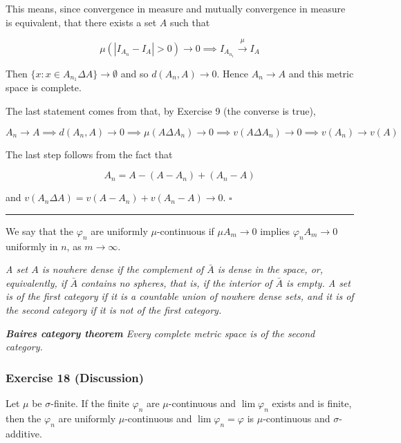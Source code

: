\documentclass[
]{article}
\begin{document}
This means, since convergence in measure and mutually convergence in
measure is equivalent, that there exists a set \(A\) such that

\[\mu\left(\left|I_{A_{n}} - I_{A}\right| > 0 \right) \to 0 \implies I_{A_{n_1}} \xrightarrow{\mu} I_A\]

Then \(\{x: x\in A_{n_1}\Delta A\} \to \emptyset\) and so
\(d(A_n, A) \to 0\). Hence \(A_n\to A\) and this metric space is
complete.

The last statement comes from that, by Exercise 9 (the converse is
true),

\[A_n \to A \implies d(A_n, A) \to 0 \implies \mu(A \Delta A_n) \to 0 \implies v(A \Delta A_n) \to 0 \implies v(A_n) \to v(A)\]

The last step follows from the fact that

\[A_n = A - (A - A_n) + (A_n - A)\]

and \(v(A_n\Delta A) = v(A - A_n) + v(A_n - A) \to 0\). \(\square\)

\begin{center}\rule{0.5\linewidth}{0.5pt}\end{center}

We say that the \(\varphi_n\) are uniformly \(\mu\)-continuous if
\(\mu A_m \rightarrow 0\) implies \(\varphi_n A_m \rightarrow 0\)
uniformly in \(n\), as \(m \rightarrow \infty\).

\emph{A set \(A\) is nowhere dense if the complement of \(\bar{A}\) is
  dense in the space, or, equivalently, if \(\bar{A}\) contains no
  spheres, that is, if the interior of \(\bar{A}\) is empty. A set is of
  the first category if it is a countable union of nowhere dense sets, and
  it is of the second category if it is not of the first category.}

\emph{\textbf{Baire\textquotesingle s category theorem} Every complete
  metric space is of the second category.}

\hypertarget{exercise-18-discussion}{%
  \subsubsection{Exercise 18 (Discussion)}\label{exercise-18-discussion}}

Let \(\mu\) be \(\sigma\)-finite. If the finite \(\varphi_n\) are
\(\mu\)-continuous and \(\lim \varphi_n\) exists and is finite, then the
\(\varphi_n\) are uniformly \(\mu\)-continuous and
\(\lim \varphi_n=\varphi\) is \(\mu\)-continuous and
\(\sigma\)-additive.
\end{document}
